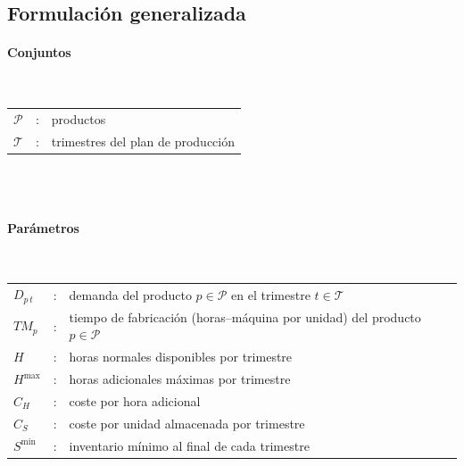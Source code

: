 















\subsection{Formulación generalizada}

\paragraph{Conjuntos}\mbox{}\\

\begin{tabular}{l c l}
    $\mathcal{P}$ & : & productos \\
    $\mathcal{T}$ & : & trimestres del plan de producción \\
\end{tabular}
\\
\\

\paragraph{Parámetros}\mbox{}\\

\begin{tabular}{l c l}
    $D_{p\,t}$ & : & demanda del producto $p \in \mathcal{P}$ en el trimestre $t \in \mathcal{T}$ \\
    $TM_p$     & : & tiempo de fabricación (horas--máquina por unidad) del producto $p \in \mathcal{P}$ \\
    $H$        & : & horas normales disponibles por trimestre \\
    $H^{\max}$ & : & horas adicionales máximas por trimestre \\
    $C_H$      & : & coste por hora adicional \\
    $C_S$      & : & coste por unidad almacenada por trimestre \\
    $S^{\min}$ & : & inventario mínimo al final de cada trimestre \\
\end{tabular}
\\
\\

